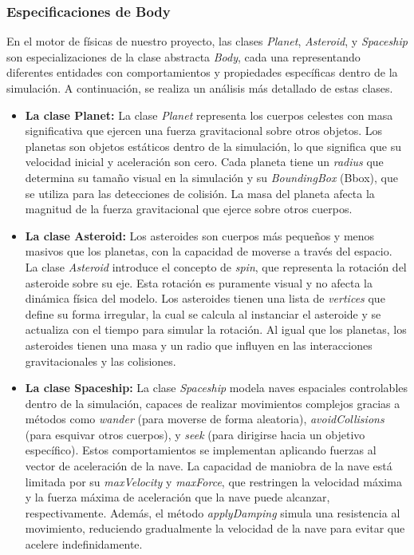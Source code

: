 \subsubsection{Especificaciones de Body}
En el motor de físicas de nuestro proyecto, las clases \textit{Planet}, \textit{Asteroid}, y \textit{Spaceship} son especializaciones de la clase abstracta \textit{Body}, cada una representando diferentes entidades con comportamientos y propiedades específicas dentro de la simulación. A continuación, se realiza un análisis más detallado de estas clases.
\begin{itemize}
    \item \textbf{La clase Planet:} La clase \textit{Planet} representa los cuerpos celestes con masa significativa que ejercen una fuerza gravitacional sobre otros objetos. Los planetas son objetos estáticos dentro de la simulación, lo que significa que su velocidad inicial y aceleración son cero. Cada planeta tiene un \textit{radius} que determina su tamaño visual en la simulación y su \textit{BoundingBox} (Bbox), que se utiliza para las detecciones de colisión. La masa del planeta afecta la magnitud de la fuerza gravitacional que ejerce sobre otros cuerpos.
    \item \textbf{La clase Asteroid:} Los asteroides son cuerpos más pequeños y menos masivos que los planetas, con la capacidad de moverse a través del espacio. La clase \textit{Asteroid} introduce el concepto de \textit{spin}, que representa la rotación del asteroide sobre su eje. Esta rotación es puramente visual y no afecta la dinámica física del modelo. Los asteroides tienen una lista de \textit{vertices} que define su forma irregular, la cual se calcula al instanciar el asteroide y se actualiza con el tiempo para simular la rotación. Al igual que los planetas, los asteroides tienen una masa y un radio que influyen en las interacciones gravitacionales y las colisiones.
    \item \textbf{La clase Spaceship:} La clase \textit{Spaceship} modela naves espaciales controlables dentro de la simulación, capaces de realizar movimientos complejos gracias a métodos como \textit{wander} (para moverse de forma aleatoria), \textit{avoidCollisions} (para esquivar otros cuerpos), y \textit{seek} (para dirigirse hacia un objetivo específico). Estos comportamientos se implementan aplicando fuerzas al vector de aceleración de la nave. La capacidad de maniobra de la nave está limitada por su \textit{maxVelocity} y \textit{maxForce}, que restringen la velocidad máxima y la fuerza máxima de aceleración que la nave puede alcanzar, respectivamente. Además, el método \textit{applyDamping} simula una resistencia al movimiento, reduciendo gradualmente la velocidad de la nave para evitar que acelere indefinidamente.
\end{itemize}

